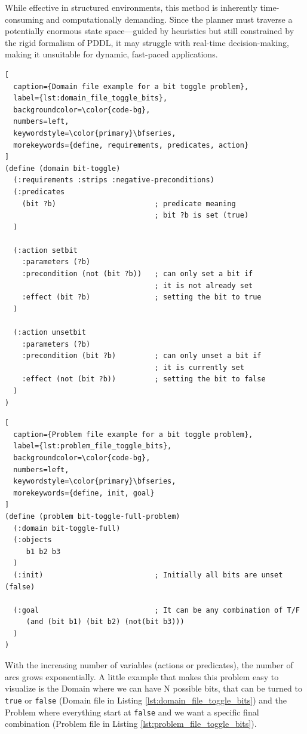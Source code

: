 While effective in structured environments, this method is inherently time-consuming
and computationally demanding. Since the planner must traverse a potentially
enormous state space—guided by heuristics but still constrained by the rigid
formalism of PDDL, it may struggle with real-time decision-making, making it
unsuitable for dynamic, fast-paced applications.

\begin{lstlisting}[
  caption={Domain file example for a bit toggle problem},
  label={lst:domain_file_toggle_bits},
  backgroundcolor=\color{code-bg},
  numbers=left,
  keywordstyle=\color{primary}\bfseries,
  morekeywords={define, requirements, predicates, action}
]
(define (domain bit-toggle)
  (:requirements :strips :negative-preconditions)
  (:predicates
    (bit ?b)                       ; predicate meaning
                                   ; bit ?b is set (true)
  )

  (:action setbit
    :parameters (?b)
    :precondition (not (bit ?b))   ; can only set a bit if
                                   ; it is not already set
    :effect (bit ?b)               ; setting the bit to true
  )

  (:action unsetbit
    :parameters (?b)
    :precondition (bit ?b)         ; can only unset a bit if
                                   ; it is currently set
    :effect (not (bit ?b))         ; setting the bit to false
  )
)
\end{lstlisting}

\begin{lstlisting}[
  caption={Problem file example for a bit toggle problem},
  label={lst:problem_file_toggle_bits},
  backgroundcolor=\color{code-bg},
  numbers=left,
  keywordstyle=\color{primary}\bfseries,
  morekeywords={define, init, goal}
]
(define (problem bit-toggle-full-problem)
  (:domain bit-toggle-full)
  (:objects
     b1 b2 b3
  )
  (:init)                          ; Initially all bits are unset (false)

  (:goal                           ; It can be any combination of T/F
     (and (bit b1) (bit b2) (not(bit b3)))
  )
)
\end{lstlisting}

With the increasing number of variables (actions or predicates), the number of
arcs grows exponentially. A little example that makes this problem easy to visualize
is the Domain where we can have N possible bits, that can be turned to \texttt{true}
or \texttt{false} (Domain file in Listing \ref{lst:domain_file_toggle_bits}) and
the Problem where everything start at \texttt{false} and we want a specific final
combination (Problem file in Listing \ref{lst:problem_file_toggle_bits}).


